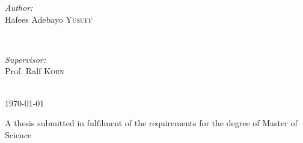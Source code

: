 \begin{titlepage}
\begin{minipage}{0.4\textwidth}
\begin{flushleft} \large
\emph{Author:}\\
Hafees Adebayo \textsc{Yusuff} %
\end{flushleft}
\end{minipage}
~
\begin{minipage}{0.4\textwidth}
\begin{flushleft} \large
\emph{Supervisor:} \\
Prof. Ralf \textsc{Korn} %
\end{flushleft}
\end{minipage}\\[4cm]




{\large \today}\\[3cm] %
\vspace{2.5cm}


A thesis submitted in fulfilment of the requirements for the degree of
Master of Science




\vfill %
\end{titlepage}



